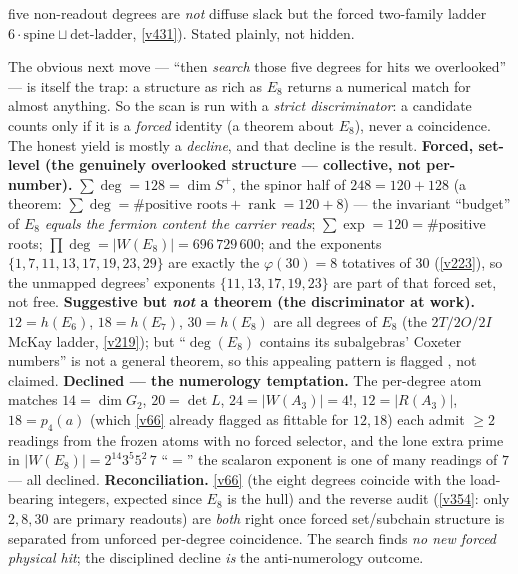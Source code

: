 \begin{winbox}
five non-readout degrees are \emph{not} diffuse slack but the forced two-family ladder $6\cdot\text{spine}\sqcup\text{det-ladder}$, \vref{v431}). Stated plainly, not hidden.
\end{winbox}

\begin{winbox}
The obvious next move --- ``then \emph{search} those five degrees for hits we overlooked'' --- is itself the trap: a structure as rich as $E_8$ returns a numerical match for almost anything. So the scan is run with a \emph{strict discriminator}: a candidate counts only if it is a \emph{forced} identity (a theorem about $E_8$), never a coincidence. The honest yield is mostly a \emph{decline}, and that decline is the result. \textbf{Forced, set-level (the genuinely overlooked structure --- collective, not per-number).} $\sum\deg = 128 = \dim S^+$, the spinor half of $248 = 120 + 128$ (a theorem: $\sum\deg = \#\text{positive roots} + \operatorname{rank} = 120 + 8$) --- the invariant ``budget'' of $E_8$ \emph{equals the fermion content the carrier reads}; $\sum\exp = 120 = \#$positive roots; $\prod\deg = |W(E_8)| = 696{\,}729{\,}600$; and the exponents $\{1,7,11,13,17,19,23,29\}$ are exactly the $\varphi(30)=8$ totatives of $30$ (\vref{v223}), so the unmapped degrees' exponents $\{11,13,17,19,23\}$ are part of that forced set, not free. \textbf{Suggestive but \emph{not} a theorem (the discriminator at work).} $12 = h(E_6)$, $18 = h(E_7)$, $30 = h(E_8)$ are all degrees of $E_8$ (the $2T/2O/2I$ McKay ladder, \vref{v219}); but ``$\deg(E_8)$ contains its subalgebras' Coxeter numbers'' is not a general theorem, so this appealing pattern is flagged \mC, not claimed. \textbf{Declined --- the numerology temptation.} The per-degree atom matches $14{=}\dim G_2$, $20{=}\det L$, $24{=}|W(A_3)|{=}4!$, $12{=}|R(A_3)|$, $18{=}p_4(a)$ (which \vref{v66} already flagged as fittable for $12,18$) each admit $\ge2$ readings from the frozen atoms with no forced selector, and the lone extra prime in $|W(E_8)| = 2^{14}3^5 5^2\,7$ ``$=$'' the scalaron exponent is one of many readings of $7$ --- all declined. \textbf{Reconciliation.} \vref{v66} (the eight degrees coincide with the load-bearing integers, expected since $E_8$ is the hull) and the reverse audit (\vref{v354}: only $2,8,30$ are primary readouts) are \emph{both} right once forced set/subchain structure is separated from unforced per-degree coincidence. The search finds \emph{no new forced physical hit}; the disciplined decline \emph{is} the anti-numerology outcome.
\end{winbox}

